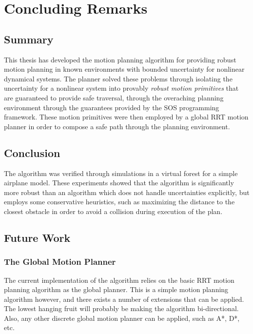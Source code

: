 \chapter{Concluding Remarks}
\label{chp:concluding-remarks}

\section{Summary}

This thesis has developed the \rrtfunnel{} motion planning algorithm for
providing robust motion planning in known environments with bounded uncertainty
for nonlinear dynamical systems. The planner solved these problems through
isolating the uncertainty for a nonlinear system into provably \textit{robust
  motion primitives} that are guaranteed to provide safe traversal, through the
overaching planning environment through the guarantees provided by the \ac{SOS}
programming framework. These motion primitives were then employed by a global
\ac{RRT} motion planner in order to compose a safe path through the planning
environment.

\section{Conclusion}

The algorithm was verified through simulations in a virtual forest for a simple
airplane model. These experiments showed that the \rrtfunnel{} algorithm is
significantly more robust than an algorithm which does not handle uncertainties
explicitly, but employs some conservative heuristics, such as maximizing the
distance to the closest obstacle in order to avoid a collision during execution
of the plan.


\section{Future Work}

\subsection{The Global Motion Planner}

The current implementation of the \rrtfunnel{} algorithm relies on the basic
\ac{RRT} motion planning algorithm as the global planner. This is a simple
motion planning algorithm however, and there exists a number of extensions that
can be applied. The lowest hanging fruit will probably be making the algorithm
bi-directional. Also, any other discrete global motion planner can be applied,
such as A*, D*, etc.

